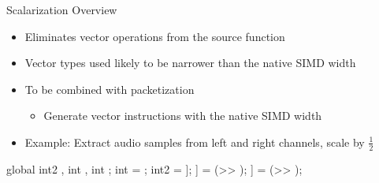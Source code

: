 
\begin{frame}[fragile]{Scalarization Overview}

\begin{itemize}
    \item Eliminates vector operations from the source function
    \item Vector types used likely to be narrower than the native SIMD width
    \item To be combined with packetization
    \begin{itemize}
        \item Generate vector instructions with the native SIMD width
    \end{itemize}
    \item Example: Extract audio samples  from left and right channels, scale by $\frac{1}{2}$
\end{itemize}

\begin{codebox}[commandchars=\\\[\]]
global int2 \uniform[*src], int \uniform[*left], int \uniform[*right];
int \varying[tid] = ;
int2 \varying[sample] = \uniform[src]\idx[\varying[tid]];
\uniform[left]\idx[\varying[tid]] = (\varying[sample.x] >> \uniform[1]);
\uniform[right]\idx[\varying[tid]] = (\varying[sample.y] >> \uniform[1]);
\end{codebox}

\end{frame}


%
%    
%    
%

